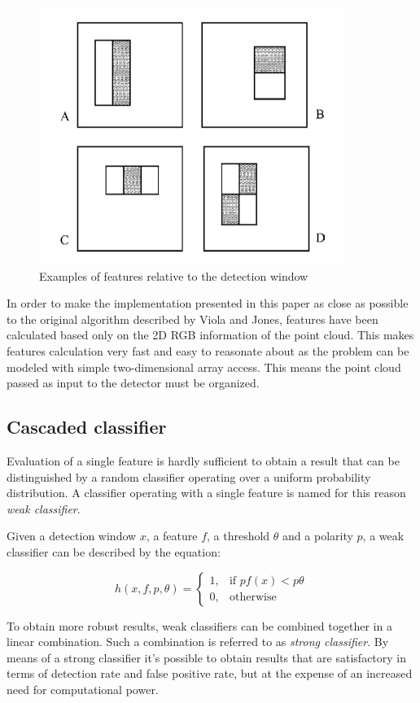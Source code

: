 \documentclass[a4paper,11pt,titlepage]{article}
\begin{document}
\begin{figure}[h]
  \centering
  \includegraphics[scale=0.5]{features.jpg}
  \caption{Examples of features relative to the detection window}
  \label{fig:features}
\end{figure}

In order to make the implementation presented in this paper as close as possible
to the original algorithm described by Viola and Jones, features have been
calculated based only on the 2D RGB information of the point cloud. This makes
features calculation very fast and easy to reasonate about as the problem can be
modeled with simple two-dimensional array access. This means the point cloud
passed as input to the detector must be organized.

\subsection{Cascaded classifier}
Evaluation of a single feature is hardly sufficient to obtain a result that can
be distinguished by a random classifier operating over a uniform probability
distribution. A classifier operating with a single feature is named for this
reason \emph{weak classifier}.

Given a detection window $x$, a feature $f$, a threshold $\theta$ and a polarity
$p$, a weak classifier can be described by the equation:

\[ 
  h(x,f,p,\theta) = 
\begin{cases}
  1,& \text{if } pf(x) < p\theta \\ 0,& \text{otherwise}
\end{cases}
\]

To obtain more robust results, weak classifiers can be combined together in a
linear combination. Such a combination is referred to as \emph{strong
classifier}. By means of a strong classifier it's possible to obtain
results that are satisfactory in terms of detection rate and false positive
rate, but at the expense of an increased need for computational power.
\end{document}
